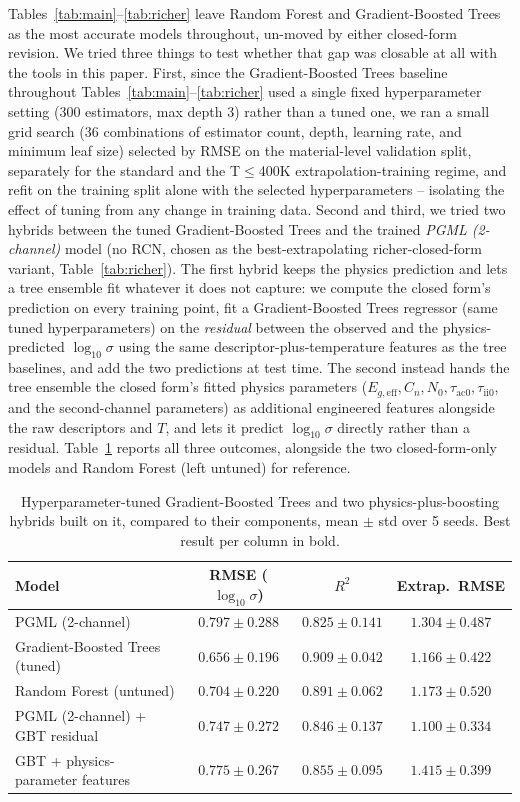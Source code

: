 \documentclass[11pt]{article}
\begin{document}
Tables~\ref{tab:main}--\ref{tab:richer} leave Random Forest and Gradient-Boosted Trees as the most accurate models throughout, un-moved by either closed-form revision. We tried three things to test whether that gap was closable at all with the tools in this paper. First, since the Gradient-Boosted Trees baseline throughout Tables~\ref{tab:main}--\ref{tab:richer} used a single fixed hyperparameter setting (300 estimators, max depth 3) rather than a tuned one, we ran a small grid search (36 combinations of estimator count, depth, learning rate, and minimum leaf size) selected by RMSE on the material-level validation split, separately for the standard and the T$\leq$400K extrapolation-training regime, and refit on the training split alone with the selected hyperparameters -- isolating the effect of tuning from any change in training data. Second and third, we tried two hybrids between the tuned Gradient-Boosted Trees and the trained \emph{PGML (2-channel)} model (no RCN, chosen as the best-extrapolating richer-closed-form variant, Table~\ref{tab:richer}). The first hybrid keeps the physics prediction and lets a tree ensemble fit whatever it does not capture: we compute the closed form's prediction on every training point, fit a Gradient-Boosted Trees regressor (same tuned hyperparameters) on the \emph{residual} between the observed and the physics-predicted $\log_{10}\sigma$ using the same descriptor-plus-temperature features as the tree baselines, and add the two predictions at test time. The second instead hands the tree ensemble the closed form's fitted physics parameters ($E_{g,\text{eff}}, C_n, N_0, \tau_{\text{ac}0}, \tau_{\text{ii}0}$, and the second-channel parameters) as additional engineered features alongside the raw descriptors and $T$, and lets it predict $\log_{10}\sigma$ directly rather than a residual. Table~\ref{tab:hybrid} reports all three outcomes, alongside the two closed-form-only models and Random Forest (left untuned) for reference.

\begin{table}[h]
\centering
\caption{Hyperparameter-tuned Gradient-Boosted Trees and two physics-plus-boosting hybrids built on it, compared to their components, mean $\pm$ std over 5 seeds. Best result per column in bold.}
\label{tab:hybrid}
\begin{tabular}{lccc}
\toprule
Model & RMSE ($\log_{10}\sigma$) & $R^2$ & Extrap.\ RMSE \\
\midrule
PGML (2-channel)                    & $0.797 \pm 0.288$ & $0.825 \pm 0.141$ & $1.304 \pm 0.487$ \\
Gradient-Boosted Trees (tuned)       & $\mathbf{0.656 \pm 0.196}$ & $\mathbf{0.909 \pm 0.042}$ & $1.166 \pm 0.422$ \\
Random Forest (untuned)              & $0.704 \pm 0.220$ & $0.891 \pm 0.062$ & $1.173 \pm 0.520$ \\
PGML (2-channel) + GBT residual      & $0.747 \pm 0.272$ & $0.846 \pm 0.137$ & $\mathbf{1.100 \pm 0.334}$ \\
GBT + physics-parameter features     & $0.775 \pm 0.267$ & $0.855 \pm 0.095$ & $1.415 \pm 0.399$ \\
\bottomrule
\end{tabular}
\end{table}
\end{document}
